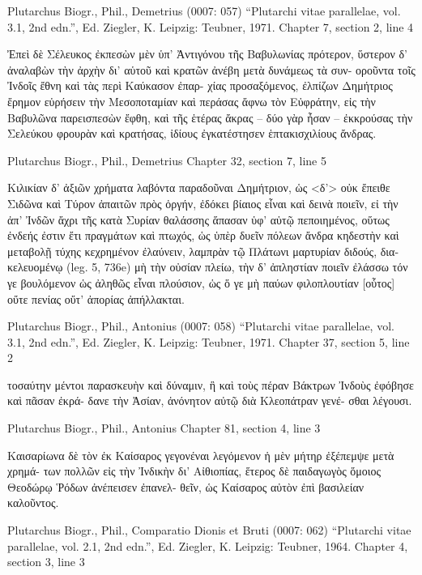 \documentclass[12pt,letterpaper,twoside,final]{memoir}
\begin{document}
\begin{greek}
Plutarchus Biogr., Phil., Demetrius (0007: 057)
“Plutarchi vitae parallelae, vol. 3.1, 2nd edn.”, Ed. Ziegler, K.
Leipzig: Teubner, 1971.
Chapter 7, section 2, line 4

Ἐπεὶ δὲ Σέλευκος ἐκπεσὼν μὲν ὑπ' Ἀντιγόνου τῆς 
Βαβυλωνίας πρότερον, ὕστερον δ' ἀναλαβὼν τὴν ἀρχὴν 
δι' αὑτοῦ καὶ κρατῶν ἀνέβη μετὰ δυνάμεως τὰ συν-
οροῦντα τοῖς Ἰνδοῖς ἔθνη καὶ τὰς περὶ Καύκασον ἐπαρ-
χίας προσαξόμενος, ἐλπίζων Δημήτριος ἔρημον εὑρήσειν 
τὴν Μεσοποταμίαν καὶ περάσας ἄφνω τὸν Εὐφράτην, εἰς 
τὴν Βαβυλῶνα παρεισπεσὼν ἔφθη, καὶ τῆς ἑτέρας ἄκρας 
– δύο γὰρ ἦσαν – ἐκκρούσας τὴν Σελεύκου φρουρὰν 
καὶ κρατήσας, ἰδίους ἐγκατέστησεν ἑπτακισχιλίους ἄνδρας. 



Plutarchus Biogr., Phil., Demetrius 
Chapter 32, section 7, line 5

                               Κιλικίαν δ' ἀξιῶν χρήματα 
λαβόντα παραδοῦναι Δημήτριον, ὡς <δ'> οὐκ ἔπειθε 
Σιδῶνα καὶ Τύρον ἀπαιτῶν πρὸς ὀργήν, ἐδόκει βίαιος 
εἶναι καὶ δεινὰ ποιεῖν, εἰ τὴν ἀπ' Ἰνδῶν ἄχρι τῆς κατὰ 
Συρίαν θαλάσσης ἅπασαν ὑφ' αὑτῷ πεποιημένος, οὕτως 
ἐνδεής ἐστιν ἔτι πραγμάτων καὶ πτωχός, ὡς ὑπὲρ δυεῖν 
πόλεων ἄνδρα κηδεστὴν καὶ μεταβολῇ τύχης κεχρημένον 
ἐλαύνειν, λαμπρὰν τῷ Πλάτωνι μαρτυρίαν διδούς, δια-  
κελευομένῳ (leg. 5, 736e) μὴ τὴν οὐσίαν πλείω, τὴν δ' 
ἀπληστίαν ποιεῖν ἐλάσσω τόν γε βουλόμενον ὡς ἀληθῶς 
εἶναι πλούσιον, ὡς ὅ γε μὴ παύων φιλοπλουτίαν [οὗτος] 
οὔτε πενίας οὔτ' ἀπορίας ἀπήλλακται. 



Plutarchus Biogr., Phil., Antonius (0007: 058)
“Plutarchi vitae parallelae, vol. 3.1, 2nd edn.”, Ed. Ziegler, K.
Leipzig: Teubner, 1971.
Chapter 37, section 5, line 2

         τοσαύτην μέντοι παρασκευὴν καὶ δύναμιν, ἣ καὶ 
τοὺς πέραν Βάκτρων Ἰνδοὺς ἐφόβησε καὶ πᾶσαν ἐκρά-
δανε τὴν Ἀσίαν, ἀνόνητον αὐτῷ διὰ Κλεοπάτραν γενέ-
σθαι λέγουσι. 



Plutarchus Biogr., Phil., Antonius 
Chapter 81, section 4, line 3

                              Καισαρίωνα δὲ τὸν ἐκ Καίσαρος 
γεγονέναι λεγόμενον ἡ μὲν μήτηρ ἐξέπεμψε μετὰ χρημά-
των πολλῶν εἰς τὴν Ἰνδικὴν δι' Αἰθιοπίας, ἕτερος δὲ 
παιδαγωγὸς ὅμοιος Θεοδώρῳ Ῥόδων ἀνέπεισεν ἐπανελ-  
θεῖν, ὡς Καίσαρος αὐτὸν ἐπὶ βασιλείαν καλοῦντος. 



Plutarchus Biogr., Phil., Comparatio Dionis et Bruti (0007: 062)
“Plutarchi vitae parallelae, vol. 2.1, 2nd edn.”, Ed. Ziegler, K.
Leipzig: Teubner, 1964.
Chapter 4, section 3, line 3


\end{greek}
\end{document}
